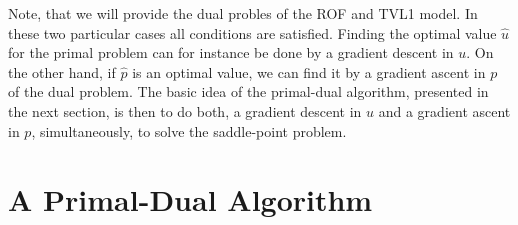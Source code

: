 \documentclass[abstracton]{scrreprt}
\begin{document}
        Note, that we will provide the dual probles of the ROF and TVL1 model. In these two particular cases all conditions are satisfied. Finding the optimal value $\hat{u}$ for the primal problem can for instance be done by a gradient descent in $u$. On the other hand, if $\hat{p}$ is an optimal value, we can find it by a gradient ascent in $p$ of the dual problem. The basic idea of the primal-dual algorithm, presented in the next section, is then to do both, a gradient descent in $u$ and a gradient ascent in $p$, simultaneously, to solve the saddle-point problem.

    \section{A Primal-Dual Algorithm} %
    \label{sec:a_firs_order_primal_dual_algorithm}
\end{document}
